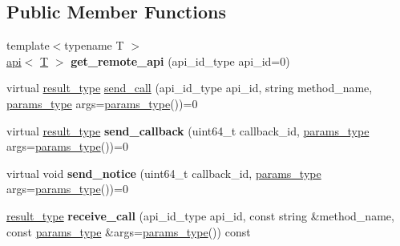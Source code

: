 \subsection*{Public Member Functions}
\begin{DoxyCompactItemize}
\item 
\mbox{\label{classfc_1_1binary__api__connection_a6d6a77fb12a278a9c5becdffcbc418db}} 
{\footnotesize template$<$typename T $>$ }\\\mbox{\hyperlink{classfc_1_1api}{api}}$<$ \mbox{\hyperlink{struct_t}{T}} $>$ {\bfseries get\+\_\+remote\+\_\+api} (api\+\_\+id\+\_\+type api\+\_\+id=0)
\item 
virtual \mbox{\hyperlink{classstd_1_1vector}{result\+\_\+type}} \mbox{\hyperlink{classfc_1_1binary__api__connection_af4db40adde5c6271df5163f5e3e7159f}{send\+\_\+call}} (api\+\_\+id\+\_\+type api\+\_\+id, string method\+\_\+name, \mbox{\hyperlink{classstd_1_1vector}{params\+\_\+type}} args=\mbox{\hyperlink{classstd_1_1vector}{params\+\_\+type}}())=0
\item 
\mbox{\label{classfc_1_1binary__api__connection_a685bce1e116b7a14437e619ec7caa222}} 
virtual \mbox{\hyperlink{classstd_1_1vector}{result\+\_\+type}} {\bfseries send\+\_\+callback} (uint64\+\_\+t callback\+\_\+id, \mbox{\hyperlink{classstd_1_1vector}{params\+\_\+type}} args=\mbox{\hyperlink{classstd_1_1vector}{params\+\_\+type}}())=0
\item 
\mbox{\label{classfc_1_1binary__api__connection_a28984937cdd6989e47fb903559e07550}} 
virtual void {\bfseries send\+\_\+notice} (uint64\+\_\+t callback\+\_\+id, \mbox{\hyperlink{classstd_1_1vector}{params\+\_\+type}} args=\mbox{\hyperlink{classstd_1_1vector}{params\+\_\+type}}())=0
\item 
\mbox{\label{classfc_1_1binary__api__connection_a0ce42b56e43afc811facd136c7abca50}} 
\mbox{\hyperlink{classstd_1_1vector}{result\+\_\+type}} {\bfseries receive\+\_\+call} (api\+\_\+id\+\_\+type api\+\_\+id, const string \&method\+\_\+name, const \mbox{\hyperlink{classstd_1_1vector}{params\+\_\+type}} \&args=\mbox{\hyperlink{classstd_1_1vector}{params\+\_\+type}}()) const
\item 
\mbox{\label{classfc_1_1binary__api__connection_a9bb2b3c0efeff20719352d025a88aa5e}} 

\end{DoxyCompactItemize}
